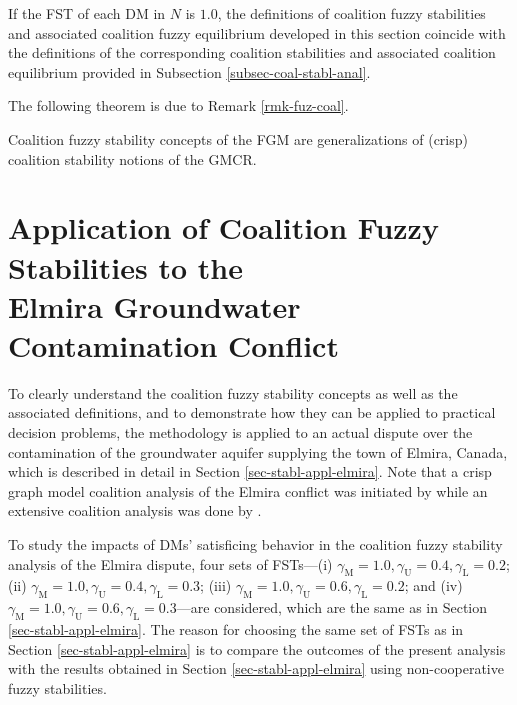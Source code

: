 \begin{remark}\label{rmk-fuz-coal}
\rm If the FST of each DM in $N$ is $1.0$, the definitions of coalition fuzzy stabilities and associated coalition fuzzy equilibrium developed in this section coincide with the definitions of the corresponding coalition stabilities and associated coalition equilibrium provided in Subsection \ref{subsec-coal-stabl-anal}.
\end{remark}

\noindent The following theorem is due to Remark \ref{rmk-fuz-coal}.

\begin{theorem}
\rm Coalition fuzzy stability concepts of the FGM are generalizations of (crisp) coalition stability notions of the GMCR.
\end{theorem}

\section{Application of Coalition Fuzzy Stabilities to the \\Elmira Groundwater Contamination Conflict}\label{sec-cfs-appl}

To clearly understand the coalition fuzzy stability concepts as well as the associated definitions, and to demonstrate how they can be applied to practical decision problems, the methodology is applied to an actual dispute over the contamination of the groundwater aquifer supplying the town of Elmira, Canada, which is described in detail in Section \ref{sec-stabl-appl-elmira}. Note that a crisp graph model coalition analysis of the Elmira conflict was initiated by \citet{Kilgour-et-al2001} while an extensive coalition analysis was done by \citet{Inohara&Hipel2008a}.

To study the impacts of DMs' satisficing behavior in the coalition fuzzy stability analysis of the Elmira dispute, four sets of FSTs---(i) $\gamma_\text{M}=1.0, \gamma_\text{U}=0.4, \gamma_\text{L}=0.2$; (ii) $\gamma_\text{M}=1.0, \gamma_\text{U}=0.4, \gamma_\text{L}=0.3$; (iii) $\gamma_\text{M}=1.0, \gamma_\text{U}=0.6, \gamma_\text{L}=0.2$; and (iv) $\gamma_\text{M}=1.0, \gamma_\text{U}=0.6, \gamma_\text{L}=0.3$---are considered, which are the same as in Section \ref{sec-stabl-appl-elmira}. The reason for choosing the same set of FSTs as in Section \ref{sec-stabl-appl-elmira} is to compare the outcomes of the present analysis with the results obtained in Section \ref{sec-stabl-appl-elmira} using non-cooperative fuzzy stabilities.


